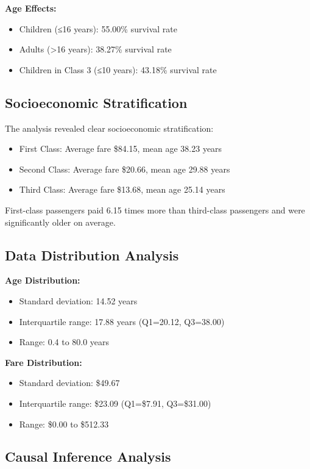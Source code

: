 \documentclass[letterpaper, 10 pt, conference]{ieeeconf}  %
\begin{document}
\textbf{Age Effects:}
\begin{itemize}
\item Children (≤16 years): 55.00\% survival rate
\item Adults (>16 years): 38.27\% survival rate
\item Children in Class 3 (≤10 years): 43.18\% survival rate
\end{itemize}

\subsection{Socioeconomic Stratification}

The analysis revealed clear socioeconomic stratification:
\begin{itemize}
\item First Class: Average fare \$84.15, mean age 38.23 years
\item Second Class: Average fare \$20.66, mean age 29.88 years
\item Third Class: Average fare \$13.68, mean age 25.14 years
\end{itemize}

First-class passengers paid 6.15 times more than third-class passengers and were significantly older on average.

\subsection{Data Distribution Analysis}

\textbf{Age Distribution:}
\begin{itemize}
\item Standard deviation: 14.52 years
\item Interquartile range: 17.88 years (Q1=20.12, Q3=38.00)
\item Range: 0.4 to 80.0 years
\end{itemize}

\textbf{Fare Distribution:}
\begin{itemize}
\item Standard deviation: \$49.67
\item Interquartile range: \$23.09 (Q1=\$7.91, Q3=\$31.00)
\item Range: \$0.00 to \$512.33
\end{itemize}

\subsection{Causal Inference Analysis}
\end{document}
